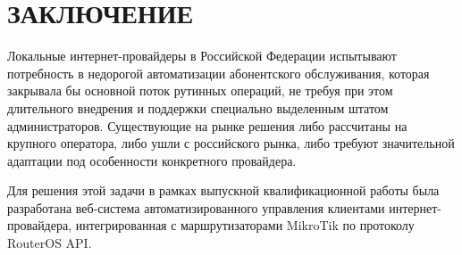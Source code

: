 \section*{ЗАКЛЮЧЕНИЕ}


Локальные интернет-провайдеры в Российской Федерации испытывают потребность в недорогой автоматизации абонентского обслуживания, которая закрывала бы основной поток рутинных операций, не требуя при этом длительного внедрения и поддержки специально выделенным штатом администраторов. Существующие на рынке решения либо рассчитаны на крупного оператора, либо ушли с российского рынка, либо требуют значительной адаптации под особенности конкретного провайдера.

Для решения этой задачи в рамках выпускной квалификационной работы была разработана веб-система автоматизированного управления клиентами интернет-провайдера, интегрированная с маршрутизаторами MikroTik по протоколу RouterOS API.

